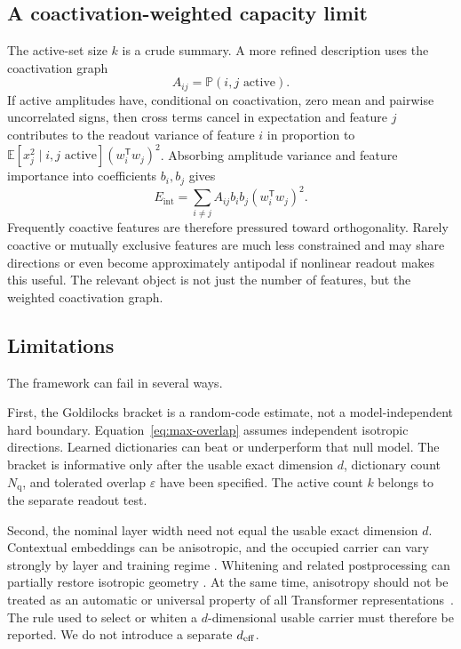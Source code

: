\documentclass[
  aps,
  reprint,
  superscriptaddress,
  floatfix,
  nofootinbib,
  longbibliography
]{revtex4-2}
\newcommand{\E}{\mathbb{E}}
\newcommand{\Prob}{\mathbb{P}}
\newcommand{\Nq}{N_{\mathrm q}}
\newcommand{\Eint}{E_{\mathrm{int}}}
\newcommand{\T}{^{\mathsf{T}}}
\begin{document}
\subsection{A coactivation-weighted capacity limit}
\label{sec:capacity-limit}

The active-set size $k$ is a crude summary. A more refined description
uses the coactivation graph
%
\begin{equation}
\label{eq:coactivation}
A_{ij}=\Prob(i,j\text{ active}).
\end{equation}
%
If active amplitudes have, conditional on coactivation, zero mean and
pairwise uncorrelated signs, then cross terms cancel in expectation and
feature $j$ contributes to the readout variance of feature $i$ in
proportion to
$\E[x_j^2\mid i,j\text{ active}](w_i\T w_j)^2$. Absorbing amplitude
variance and feature importance into coefficients $b_i,b_j$ gives
%
\begin{equation}
\label{eq:int-energy}
\Eint=
\sum_{i\neq j}
A_{ij}b_i b_j (w_i\T w_j)^2 .
\end{equation}
%
Frequently coactive features are therefore pressured toward
orthogonality. Rarely coactive or mutually exclusive features are much
less constrained and may share directions or even become approximately
antipodal if nonlinear readout makes this useful. The relevant object
is not just the number of features, but the weighted coactivation graph.

\subsection{Limitations}
\label{sec:limitations}

The framework can fail in several ways.

First, the Goldilocks bracket is a random-code estimate, not a
model-independent hard boundary. Equation~\eqref{eq:max-overlap} assumes
independent isotropic directions. Learned dictionaries can beat or
underperform that null model. The bracket is informative only after the
usable exact dimension $d$, dictionary count $\Nq$, and tolerated overlap
$\varepsilon$ have been specified. The active count $k$ belongs to the
separate readout test.

Second, the nominal layer width need not equal the usable exact dimension
$d$. Contextual embeddings can be anisotropic, and the occupied carrier can
vary strongly by layer and training regime
\cite{ethayarajh2019,gao2019representation,mu2018allbutthetop,razzhigaev2024shape}. Whitening and
related postprocessing can partially restore isotropic geometry
\cite{gao2019representation,mu2018allbutthetop,su2021whitening}. At the same time, anisotropy should not
be treated as an automatic or universal property of all Transformer
representations~\cite{machina2024anisotropy}. The rule used to select or
whiten a $d$-dimensional usable carrier must therefore be reported. We do not
introduce a separate $d_{\rm eff}$.
\end{document}
